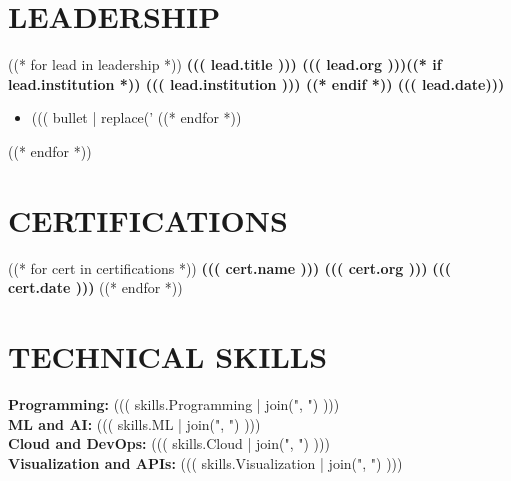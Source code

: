 \documentclass[10pt]{article}
\begin{document}
\vspace{-0.4cm}
\section*{LEADERSHIP}
\vspace{-0.1cm}
((* for lead in leadership *))
\noindent
\textbf{((( lead.title ))) \textbar{} ((( lead.org )))((* if lead.institution *)) \textbar{} ((( lead.institution ))) ((* endif *)) \hfill ((( lead.date)))} \\
\vspace{-0.4cm}
\begin{itemize}[leftmargin=0.6cm, itemsep=-0.1cm, topsep=0cm]
((* for bullet in lead.bullets *))
    \item ((( bullet | replace('%
((* endfor *))
\end{itemize}
((* endfor *))


\vspace{-0.4cm} 
\section*{CERTIFICATIONS} 
\vspace{-0.2cm}
((* for cert in certifications *))
\noindent
\textbf{((( cert.name ))) \textbar{} ((( cert.org ))) } \hfill \textbf{((( cert.date ))) }
((* endfor *))

\vspace{-0.4cm} 
\section*{TECHNICAL SKILLS} 
\vspace{-0.2cm}
\noindent
\textbf{Programming:} ((( skills.Programming | join(", ") ))) \\
\textbf{ML and AI:} ((( skills.ML | join(", ") ))) \\
\textbf{Cloud and DevOps:} ((( skills.Cloud | join(", ") ))) \\
\textbf{Visualization and APIs:} ((( skills.Visualization | join(", ") )))
\end{document}

